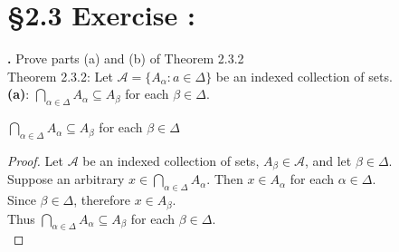 \documentclass[a4paper,11pt]{article}
\begin{document}
\newpage

\setcounter{ProblemCounter}{5}
\setcounter{SubsectionCounter}{1}
\section*{\S 2.3 Exercise :}
\textbf{.}
Prove parts (a) and (b) of Theorem 2.3.2\\
Theorem 2.3.2: Let \(\mathscr{A} = \{A_\alpha:a \in \Delta\}\) be an indexed collection of 
sets.\\
\textbf{(a)}: \(\bigcap\limits_{\alpha \in \Delta}A_\alpha\subseteq A_{\beta}\) for each \(\beta \in 
\Delta\).
\begin{theorem2}
\(\bigcap\limits_{\alpha \in \Delta}A_\alpha\subseteq A_{\beta}\) for each \(\beta \in 
\Delta\)
\begin{proof}
  Let \(\mathscr{A}\) be an indexed collection of sets, \(A_\beta \in \mathscr{A}\), and let \(\beta \in \Delta\).\\
  Suppose an arbitrary \(x \in \bigcap\limits_{\alpha \in \Delta}A_\alpha\). Then \(x \in A_\alpha\) 
  for each \(\alpha \in \Delta\).\\
  Since \(\beta \in \Delta\), therefore \(x \in A_\beta\).\\ 
  Thus \(\bigcap\limits_{\alpha \in \Delta}A_\alpha\subseteq A_{\beta}\) for each \(\beta \in 
  \Delta\).\\
\end{proof}
\end{theorem2}
\end{document}

